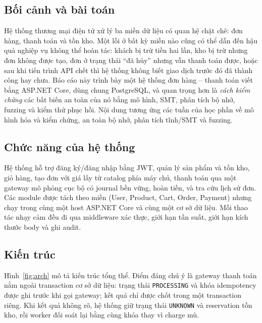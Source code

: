 \documentclass[12pt,a4paper]{article}
\begin{document}
\subsection{Bối cảnh và bài toán}
Hệ thống thương mại điện tử xử lý ba miền dữ liệu có quan hệ chặt chẽ: đơn hàng,
thanh toán và tồn kho. Một lỗi ở bất kỳ miền nào cũng có thể dẫn đến hậu quả
nghiệp vụ không thể hoàn tác: khách bị trừ tiền hai lần, kho bị trừ nhưng đơn
không được tạo, đơn ở trạng thái ``đã hủy'' nhưng vẫn thanh toán được, hoặc sau
khi tiến trình API chết thì hệ thống không biết giao dịch trước đó đã thành công
hay chưa. Báo cáo này trình bày một hệ thống đơn hàng -- thanh toán viết bằng
ASP.NET Core, dùng chung PostgreSQL, và quan trọng hơn là \emph{cách kiểm chứng}
các bất biến an toàn của nó bằng mô hình, SMT, phân tích bộ nhớ, fuzzing và kiểm
thử phục hồi. Nội dung tương ứng các tuần của học phần về mô hình hóa và kiểm
chứng, an toàn bộ nhớ, phân tích tĩnh/SMT và fuzzing.

\subsection{Chức năng của hệ thống}
Hệ thống hỗ trợ đăng ký/đăng nhập bằng JWT, quản lý sản phẩm và tồn kho, giỏ
hàng, tạo đơn với giá lấy từ catalog phía máy chủ, thanh toán qua một gateway mô
phỏng cục bộ có journal bền vững, hoàn tiền, và tra cứu lịch sử đơn. Các module
được tách theo miền (User, Product, Cart, Order, Payment) nhưng chạy trong cùng
một host ASP.NET Core và cùng một cơ sở dữ liệu. Mỗi thao tác nhạy cảm đều đi qua
middleware xác thực, giới hạn tần suất, giới hạn kích thước body và ghi audit.

\subsection{Kiến trúc}
Hình~\ref{fig:arch} mô tả kiến trúc tổng thể. Điểm đáng chú ý là gateway thanh
toán nằm ngoài transaction cơ sở dữ liệu: trạng thái \texttt{PROCESSING} và khóa
idempotency được ghi trước khi gọi gateway; kết quả chỉ được chốt trong một
transaction riêng. Khi kết quả không rõ, hệ thống giữ trạng thái \texttt{UNKNOWN}
và reservation tồn kho, rồi worker đối soát lại bằng cùng khóa thay vì charge mù.
\end{document}
